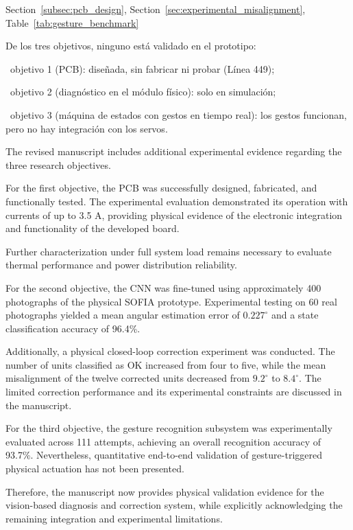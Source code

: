 \documentclass{LabDSTresponse}
\begin{document}
	{Section~\ref{subsec:pcb_design},
		Section~\ref{sec:experimental_misalignment},
		Table~\ref{tab:gesture_benchmark}}
	{De los tres objetivos, ninguno está
		validado en el prototipo:
		
		\par\noindent\textbullet\ objetivo 1 (PCB):
		diseñada, sin fabricar ni probar
		(Línea 449);
		
		\par\noindent\textbullet\ objetivo 2
		(diagnóstico en el módulo físico):
		solo en simulación;
		
		\par\noindent\textbullet\ objetivo 3
		(máquina de estados con gestos en tiempo
		real): los gestos funcionan, pero no
		hay integración con los servos.}
	{
		The revised manuscript includes additional
		experimental evidence regarding the three
		research objectives.
		
		For the first objective, the PCB was
		successfully designed, fabricated, and
		functionally tested. The experimental
		evaluation demonstrated its operation
		with currents of up to 3.5 A, providing
		physical evidence of the electronic
		integration and functionality of the
		developed board.
		
		Further characterization under full
		system load remains necessary to
		evaluate thermal performance and
		power distribution reliability.
		
		For the second objective, the CNN was
		fine-tuned using approximately 400
		photographs of the physical SOFIA prototype.
		Experimental testing on 60 real photographs
		yielded a mean angular estimation error
		of $0.227^\circ$ and a state classification
		accuracy of 96.4\%.
		
		Additionally, a physical closed-loop
		correction experiment was conducted.
		The number of units classified as OK
		increased from four to five, while the
		mean misalignment of the twelve corrected
		units decreased from $9.2^\circ$ to
		$8.4^\circ$. The limited correction
		performance and its experimental
		constraints are discussed in the manuscript.
		
		For the third objective, the gesture
		recognition subsystem was experimentally
		evaluated across 111 attempts, achieving
		an overall recognition accuracy of 93.7\%.
		Nevertheless, quantitative end-to-end
		validation of gesture-triggered physical
		actuation has not been presented.
		
		Therefore, the manuscript now provides
		physical validation evidence for the
		vision-based diagnosis and correction
		system, while explicitly acknowledging
		the remaining integration and
		experimental limitations.
	}
	
\end{document}
